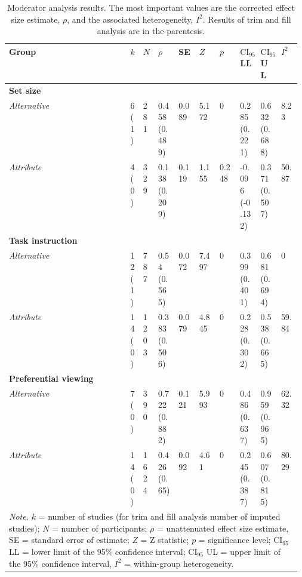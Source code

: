 \begin{table}[ht]
\centering
\caption{Moderator analysis results. The most important values are the corrected effect size estimate, $\rho$, and the associated heterogeneity, $I^2$. Results of trim and fill analysis are in the parentesis.} 
\label{tab:mod_results}
\begingroup\small
\begin{tabular}{lp{0.03\linewidth}p{0.05\linewidth}p{0.07\linewidth}p{0.07\linewidth}p{0.07\linewidth}p{0.07\linewidth}p{0.07\linewidth}p{0.07\linewidth}p{0.07\linewidth}}
  \hline
Group & $k$ & $N$ & $\rho$ & SE & $Z$ & $p$ & $\textrm{CI}_{95}$ LL & $\textrm{CI}_{95}$ UL & $I^2$ \\ 
  \hline
\textbf{Set size} &  &  &  &  &  &  &  &  &  \\ 
  \hspace{2mm}\textit{Alternative} & 6 (1) & 281 & 0.458 (0.489) & 0.089 & 5.172 & 0 & 0.285 (0.221) & 0.632 (0.688) & 8.23 \\ 
  \hspace{2mm}\textit{Attribute} & 4 (0) & 329 & 0.138 (0.209) & 0.119 & 1.155 & 0.248 & -0.096 (-0.132) & 0.371 (0.507) & 50.87 \\ 
  \textbf{Task instruction} &  &  &  &  &  &  &  &  &  \\ 
  \hspace{2mm}\textit{Alternative} & 12 (1) & 787 & 0.54 (0.565) & 0.072 & 7.497 & 0 & 0.399 (0.401) & 0.681 (0.694) & 0 \\ 
  \hspace{2mm}\textit{Attribute} & 14 (0) & 1203 & 0.383 (0.506) & 0.079 & 4.845 & 0 & 0.228 (0.302) & 0.538 (0.665) & 59.84 \\ 
  \textbf{Preferential viewing} &  &  &  &  &  &  &  &  &  \\ 
  \hspace{2mm}\textit{Alternative} & 7 (0) & 390 & 0.722 (0.882) & 0.121 & 5.993 & 0 & 0.486 (0.637) & 0.959 (0.965) & 62.32 \\ 
  \hspace{2mm}\textit{Attribute} & 14 (0) & 1624 & 0.426 (0.65) & 0.092 & 4.61 & 0 & 0.245 (0.387) & 0.607 (0.815) & 80.29 \\ 
   \hline 
 \multicolumn{10}{p{0.9\textwidth}}{\scriptsize{\textit{Note.} $k$ = number of studies (for trim and fill analysis number of imputed studies); $N$ = number of participants; $\rho$ = unattenuated effect size estimate, SE = standard error of estimate; $Z$ = Z statistic; $p$ = significance level; $\textrm{CI}_{95}$ LL = lower limit of the 95\% confidence interval; $\textrm{CI}_{95}$ UL = upper limit of the 95\% confidence interval, $I^2$ = within-group heterogeneity.}} 
\end{tabular}
\endgroup
\end{table}
